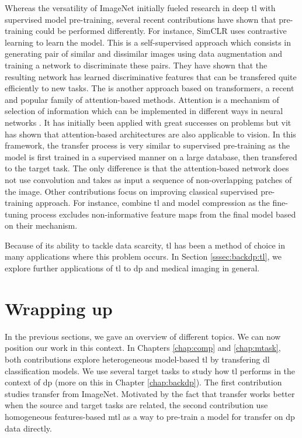 Whereas the versatility of ImageNet initially fueled research in deep \acrlong{tl}
with supervised model pre-training, several recent contributions have shown that
pre-training could be performed differently. For instance, SimCLR \parencite{chen2020simple}
uses contrastive learning to learn the model. This is a self-supervised approach
which consists in generating pair of similar and dissimilar images using data
augmentation and training a network to discriminate these pairs. They have shown
that the resulting network has learned discriminative features that can be transfered
quite efficiently to new tasks. The  \parencite{dosovitskiy2020image}
is another approach based on transformers, a recent and popular family of
attention-based methods. Attention is a mechanism of selection of information
which can be implemented in different ways in neural networks \parencite{niu2021review}.
It has initially been applied with great successes on  problems
but \acrshort{vit} has shown that attention-based architectures are also applicable
to vision. In this framework, the transfer process is very similar to supervised
pre-training as the model is first trained in a supervised manner on a large
database, then transfered to the target task. The only difference is that the
attention-based network does not use convolution and takes as input a sequence of
non-overlapping patches of the image. Other contributions focus on improving
classical supervised pre-training approach. For instance, \parencite{wang2019pay}
combine \acrlong{tl} and model compression as the fine-tuning process excludes
non-informative feature maps from the final model based on their 
mechanism.

Because of its ability to tackle data scarcity, \acrlong{tl} has been a method of
choice in many applications where this problem occurs. In Section \ref{sssec:backdp:tl},
we explore further applications of \acrlong{tl} to \acrlong{dp} and medical imaging
in general.

\section{Wrapping up}
\label{sec:backml:wrapup}

In the previous sections, we gave an overview of different topics. We can now position our work in this context. In Chapters \ref{chap:comp}
and \ref{chap:mtask}, both contributions explore heterogeneous model-based
\acrlong{tl} by transfering \acrlong{dl} classification models. We use several
target tasks to study how \acrlong{tl} performs in the context of \acrlong{dp}
(more on this in Chapter \ref{chap:backdp}). The first contribution studies transfer
from ImageNet. Motivated by the fact that transfer works better when the source
and target tasks are related, the second contribution use homogeneous features-based
\acrlong{mtl} as a way to pre-train a model for transfer on \acrlong{dp} data
directly.

